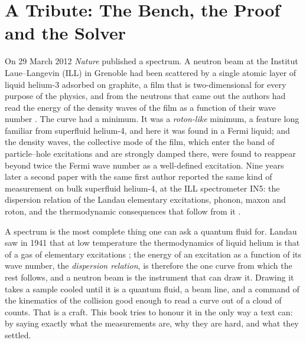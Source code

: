 \chapter{A Tribute: The Bench, the Proof and the Solver}\label{ch01}

On 29 March 2012 \emph{Nature} published a spectrum. A neutron beam at the Institut Laue--Langevin (ILL) in Grenoble had been scattered by a single atomic layer of liquid helium-3 adsorbed on graphite, a film that is two-dimensional for every purpose of the physics, and from the neutrons that came out the authors had read the energy of the density waves of the film as a function of their wave number \cite{Godfrin2012}. The curve had a minimum. It was a \emph{roton-like} minimum, a feature long familiar from superfluid helium-4, and here it was found in a Fermi liquid; and the density waves, the collective mode of the film, which enter the band of particle--hole excitations and are strongly damped there, were found to reappear beyond twice the Fermi wave number as a well-defined excitation. Nine years later a second paper with the same first author reported the same kind of measurement on bulk superfluid helium-4, at the ILL spectrometer IN5: the dispersion relation of the Landau elementary excitations, phonon, maxon and roton, and the thermodynamic consequences that follow from it \cite{Godfrin2021}.

A spectrum is the most complete thing one can ask a quantum fluid for. Landau saw in 1941 that at low temperature the thermodynamics of liquid helium is that of a gas of elementary excitations \cite{Landau1941}; the energy of an excitation as a function of its wave number, the \emph{dispersion relation}, is therefore the one curve from which the rest follows, and a neutron beam is the instrument that can draw it. Drawing it takes a sample cooled until it is a quantum fluid, a beam line, and a command of the kinematics of the collision good enough to read a curve out of a cloud of counts. That is a craft. This book tries to honour it in the only way a text can: by saying exactly what the measurements are, why they are hard, and what they settled.


